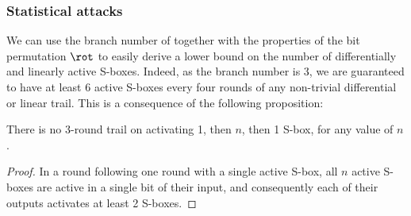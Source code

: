 \subsubsection{Statistical attacks}
\label{sec:stats}
We can use the branch number of \littlunOne together with the properties of the bit permutation $\rot$ to easily derive a lower bound on the number of
differentially and linearly active S-boxes. Indeed, as the branch number is 3, we are guaranteed to have at least 6 active S-boxes
every four rounds of any non-trivial differential or linear trail. This is a consequence of the following proposition:
\begin{prop}
\label{proppropag}
There is no 3-round trail on \fly activating 1, then $n$, then 1 S-box, for any value of $n$.
\end{prop}
\begin{proof}
In a round following one round with a single active S-box, all $n$ active S-boxes are active in a single bit of their input, and consequently
each of their outputs activates at least 2 S-boxes.
\end{proof}

